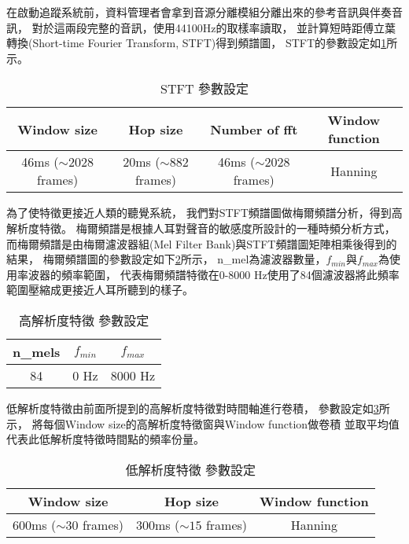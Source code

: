 \documentclass[class=NCU_thesis, crop=false]{standalone}
\begin{document}
在啟動追蹤系統前，資料管理者會拿到音源分離模組分離出來的參考音訊與伴奏音訊，
對於這兩段完整的音訊，使用44100Hz的取樣率讀取，
並計算短時距傅立葉轉換(Short-time Fourier Transform, STFT)得到頻譜圖，
STFT的參數設定如\cref{table:table-stft-parameter-setting}所示。

\begin{table}[h]
    \centering
    \caption{STFT 參數設定}
    \label{table:table-stft-parameter-setting}
    \begin{tabular}{|c|c|c|c|}
        \hline
        \multicolumn{1}{|c|}{Window size} & \multicolumn{1}{|c|}{Hop size} & \multicolumn{1}{|c|}{Number of fft} & \multicolumn{1}{|c|}{Window function}\\
        \hline
        46ms ($\sim 2028$ frames) & 20ms ($\sim 882$ frames) & 46ms ($\sim 2028$ frames) & Hanning\\
        \hline
    \end{tabular}
\end{table}

為了使特徵更接近人類的聽覺系統，
我們對STFT頻譜圖做梅爾頻譜分析，得到高解析度特徵。
梅爾頻譜是根據人耳對聲音的敏感度所設計的一種時頻分析方式，
而梅爾頻譜是由梅爾濾波器組(Mel Filter Bank)與STFT頻譜圖矩陣相乘後得到的結果，
梅爾頻譜圖的參數設定如下\cref{table:table-high-resolution-feature-parameter-setting}所示，
n\_mel為濾波器數量，$f_{min}$與$f_{max}$為使用率波器的頻率範圍，
代表梅爾頻譜特徵在0-8000 Hz使用了84個濾波器將此頻率範圍壓縮成更接近人耳所聽到的樣子。

\begin{table}[h]
    \centering
    \caption{高解析度特徵 參數設定}
    \label{table:table-high-resolution-feature-parameter-setting}
    \begin{tabular}{|c|c|c|}
        \hline
        \multicolumn{1}{|c|}{n\_mels} & \multicolumn{1}{|c|}{$f_{min}$} & \multicolumn{1}{|c|}{$f_{max}$}\\
        \hline
        84 & 0 Hz & 8000 Hz\\
        \hline
    \end{tabular}
\end{table}

低解析度特徵由前面所提到的高解析度特徵對時間軸進行卷積，
參數設定如\cref{table:table-low-resolution-feature-parameter-setting}所示，
將每個Window size的高解析度特徵窗與Window function做卷積
並取平均值代表此低解析度特徵時間點的頻率份量。

\begin{table}[h]
    \centering
    \caption{低解析度特徵 參數設定}
    \label{table:table-low-resolution-feature-parameter-setting}
    \begin{tabular}{|c|c|c|}
        \hline
        \multicolumn{1}{|c|}{Window size} & \multicolumn{1}{|c|}{Hop size} & \multicolumn{1}{|c|}{Window function}\\
        \hline
        600ms ($\sim 30$ frames) & 300ms ($\sim 15$ frames) & Hanning \\
        \hline
    \end{tabular}
\end{table}
\end{document}
